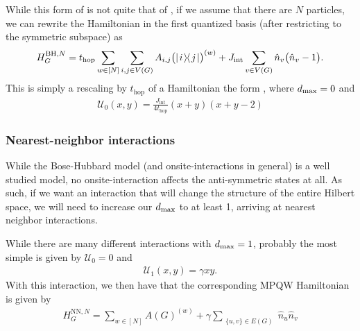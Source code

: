 \documentclass[../thesis-main/thesis-main]{subfiles}
\begin{document}
While this form of  is not quite that of , if we assume that there are $N$ particles, we can rewrite the Hamiltonian in the first quantized basis (after restricting to the symmetric subspace) as
\begin{align}
  H_G^{\text{BH},N} = t_{\text{hop}} \sum_{w\in [N]} \sum_{i,j\in V(G)} A_{i,j} \big( |\mspace{2mu} i \mspace{2mu} \rangle\mspace{-2mu}\langle\mspace{2mu} j \mspace{2mu} | \big)^{(w)} + J_{\text{int}}\sum_{v\in V(G)}\hat{n}_v\big( \hat{n}_v - 1\big).
\end{align}
This is simply a rescaling by $t_{\text{hop}}$ of a Hamiltonian the form , where $d_{\text{max}} = 0$ and 
\begin{align}
  \mathcal{U}_0(x,y) = \frac{J_{\text{int}}}{4t_{\text{hop}}} (x+y) (x+y-2)
\end{align}

\subsubsection{Nearest-neighbor interactions}

While the Bose-Hubbard model (and onsite-interactions in general) is a well studied model, no onsite-interaction affects the anti-symmetric states at all.  As such, if we want an interaction that will change the structure of the entire Hilbert space, we will need to increase our $d_{\text{max}}$ to at least 1, arriving at nearest neighbor interactions.  

While there are many different interactions with $d_{\text{max}} = 1$, probably the most simple is given by $\mathcal{U}_0 = 0$ and 
\begin{align}
  \mathcal{U}_1(x,y) = \gamma xy.
\end{align}
With this interaction, we then have that the corresponding MPQW Hamiltonian is given by
\begin{align}
  H_{G}^{\text{NN},N} = \sum_{w\in [N]} A(G)^{(w)} +  \gamma \sum_{\substack{ \{u,v\}\in E(G)}}\hat{n}_u\hat{n}_v
\end{align}

%
%
%
\end{document}
